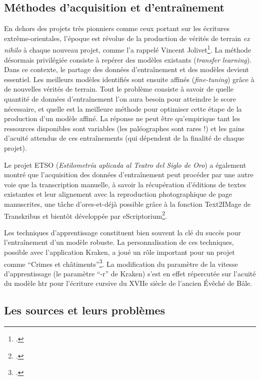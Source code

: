 \documentclass[a4paper,12pt,twoside]{book}
\begin{document}
		\subsection{Méthodes d'acquisition et d'entraînement}
		
		En dehors des projets très pionniers comme ceux portant sur les
		écritures extrême-orientales, l'époque est révolue de la production de
		vérités de terrain \textit{ex nihilo} à chaque nouveau projet, comme l'a
		rappelé Vincent Jolivet\footcite{torresaguilarModelisationAffinageHTR2022}.
		La méthode désormais privilégiée consiste à repérer des modèles
		existants (\textit{transfer learning}). Dans ce contexte, le partage des
		données d'entraînement et des modèles devient essentiel. Les meilleurs
		modèles identifiés sont ensuite affinés (\textit{fine-tuning}) grâce à de
		nouvelles vérités de terrain. Tout le problème consiste à savoir de
		quelle quantité de données d'entraînement l'on aura besoin pour
		atteindre le score nécessaire, et quelle est la meilleure méthode pour
		optimiser cette étape de la production d'un modèle affiné. La réponse ne
		peut être qu'empirique tant les ressources disponibles sont variables
		(les paléographes sont rares !) et les gains d'acuité attendus de ces
		entraînements (qui dépendent de la finalité de chaque projet).
		
		Le projet ETSO (\textit{Estilometría aplicada al Teatro del Siglo de Oro})
		a également montré que l'acquisition des données d'entraînement peut
		procéder par une autre voie que la transcription manuelle, à savoir la
		récupération d'éditions de textes existantes et leur alignement avec la
		reproduction photographique de page manuscrites, une tâche
		d'ores-et-déjà possible grâce à la fonction Text2IMage de Transkribus et
		bientôt développée par eScriptorium\footcite{cuellarModeleOuvertPour2022}.
		
		Les techniques d'apprentissage constituent bien souvent la clé du succès
		pour l'entraînement d'un modèle robuste. La personnalisation de ces
		techniques, possible avec l'application Kraken, a joué un rôle important
		pour un projet comme ``Crimes et châtiments''\footcite{paupeCursive17eSiecle2022}. La modification du paramètre de la
		vitesse d'apprentissage (le paramètre ``-r'' de Kraken) s'est en effet
		répercutée sur l'acuité du modèle \gls{htr} pour l'écriture cursive du XVIIe
		siècle de l'ancien Évêché de Bâle.
		
		\subsection{Les sources et leurs problèmes}
		
\end{document}
